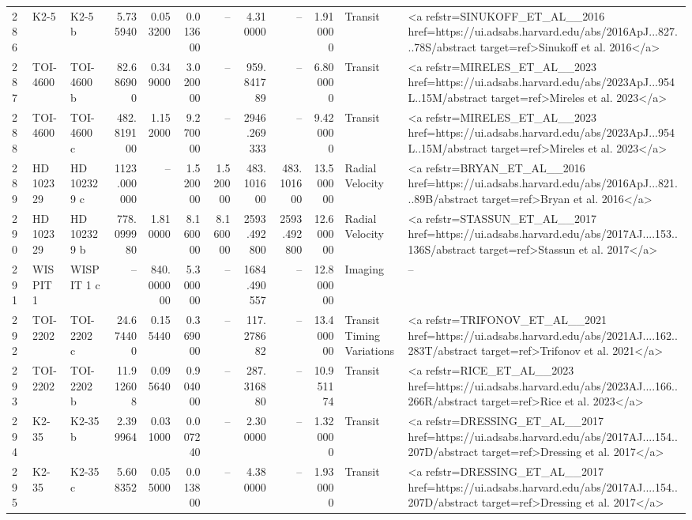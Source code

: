 \begin{tabular}{lllrrrrrrrll}
286 & K2-5 & K2-5 b & 5.735940 & 0.053200 & 0.013600 & -- & 4.310000 & -- & 1.910000 & Transit & <a refstr=SINUKOFF_ET_AL__2016 href=https://ui.adsabs.harvard.edu/abs/2016ApJ...827...78S/abstract target=ref>Sinukoff et al. 2016</a> \\
287 & TOI-4600 & TOI-4600 b & 82.686900 & 0.349000 & 3.020000 & -- & 959.841789 & -- & 6.800000 & Transit & <a refstr=MIRELES_ET_AL__2023 href=https://ui.adsabs.harvard.edu/abs/2023ApJ...954L..15M/abstract target=ref>Mireles et al. 2023</a> \\
288 & TOI-4600 & TOI-4600 c & 482.819100 & 1.152000 & 9.270000 & -- & 2946.269333 & -- & 9.420000 & Transit & <a refstr=MIRELES_ET_AL__2023 href=https://ui.adsabs.harvard.edu/abs/2023ApJ...954L..15M/abstract target=ref>Mireles et al. 2023</a> \\
289 & HD 102329 & HD 102329 c & 1123.000000 & -- & 1.520000 & 1.520000 & 483.101600 & 483.101600 & 13.500000 & Radial Velocity & <a refstr=BRYAN_ET_AL__2016 href=https://ui.adsabs.harvard.edu/abs/2016ApJ...821...89B/abstract target=ref>Bryan et al. 2016</a> \\
290 & HD 102329 & HD 102329 b & 778.099980 & 1.810000 & 8.160000 & 8.160000 & 2593.492800 & 2593.492800 & 12.600000 & Radial Velocity & <a refstr=STASSUN_ET_AL__2017 href=https://ui.adsabs.harvard.edu/abs/2017AJ....153..136S/abstract target=ref>Stassun et al. 2017</a> \\
291 & WISPIT 1 & WISPIT 1 c & -- & 840.000000 & 5.300000 & -- & 1684.490557 & -- & 12.800000 & Imaging & -- \\
292 & TOI-2202 & TOI-2202 c & 24.674400 & 0.155440 & 0.369000 & -- & 117.278682 & -- & 13.400000 & Transit Timing Variations & <a refstr=TRIFONOV_ET_AL__2021 href=https://ui.adsabs.harvard.edu/abs/2021AJ....162..283T/abstract target=ref>Trifonov et al. 2021</a> \\
293 & TOI-2202 & TOI-2202 b & 11.912608 & 0.095640 & 0.904000 & -- & 287.316880 & -- & 10.951174 & Transit & <a refstr=RICE_ET_AL__2023 href=https://ui.adsabs.harvard.edu/abs/2023AJ....166..266R/abstract target=ref>Rice et al. 2023</a> \\
294 & K2-35 & K2-35 b & 2.399964 & 0.031000 & 0.007240 & -- & 2.300000 & -- & 1.320000 & Transit & <a refstr=DRESSING_ET_AL__2017 href=https://ui.adsabs.harvard.edu/abs/2017AJ....154..207D/abstract target=ref>Dressing et al. 2017</a> \\
295 & K2-35 & K2-35 c & 5.608352 & 0.055000 & 0.013800 & -- & 4.380000 & -- & 1.930000 & Transit & <a refstr=DRESSING_ET_AL__2017 href=https://ui.adsabs.harvard.edu/abs/2017AJ....154..207D/abstract target=ref>Dressing et al. 2017</a> \\

\end{tabular}
